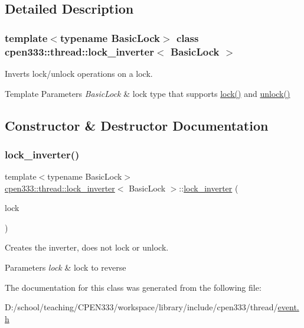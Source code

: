 \subsection{Detailed Description}
\subsubsection*{template$<$typename Basic\+Lock$>$\newline
class cpen333\+::thread\+::lock\+\_\+inverter$<$ Basic\+Lock $>$}

Inverts lock/unlock operations on a lock. 


\begin{DoxyTemplParams}{Template Parameters}
{\em Basic\+Lock} & lock type that supports \hyperlink{classcpen333_1_1thread_1_1lock__inverter_a35bd789432239cd8c9beb0e9b40811d8}{lock()} and \hyperlink{classcpen333_1_1thread_1_1lock__inverter_ae66d4cf112d29ad1b043e4a467a601d3}{unlock()} \\
\hline
\end{DoxyTemplParams}


\subsection{Constructor \& Destructor Documentation}
\mbox{\label{classcpen333_1_1thread_1_1lock__inverter_a0da2124d7f554577aa612c63ac9f74bf}} 
\subsubsection{\texorpdfstring{lock\+\_\+inverter()}{lock\_inverter()}}
{\footnotesize\ttfamily template$<$typename Basic\+Lock$>$ \\
\hyperlink{classcpen333_1_1thread_1_1lock__inverter}{cpen333\+::thread\+::lock\+\_\+inverter}$<$ Basic\+Lock $>$\+::\hyperlink{classcpen333_1_1thread_1_1lock__inverter}{lock\+\_\+inverter} (\begin{DoxyParamCaption}\item[{Basic\+Lock \&}]{lock }\end{DoxyParamCaption})\hspace{0.3cm}{\ttfamily [inline]}}



Creates the inverter, does not lock or unlock. 


\begin{DoxyParams}{Parameters}
{\em lock} & lock to reverse \\
\hline
\end{DoxyParams}


The documentation for this class was generated from the following file\+:\begin{DoxyCompactItemize}
\item 
D\+:/school/teaching/\+C\+P\+E\+N333/workspace/library/include/cpen333/thread/\hyperlink{thread_2event_8h}{event.\+h}\end{DoxyCompactItemize}

